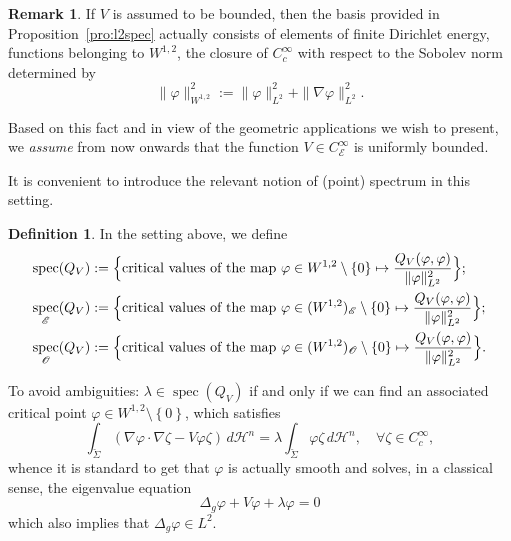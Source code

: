 \documentclass[10pt]{amsart}
\let\mathcal\mathscr
\DeclareMathOperator{\spec}{spec}
\theoremstyle{definition}
\newtheorem{definition}[thm]{Definition}
\newtheorem{rmk}[thm]{Remark}
\newcommand{\h}{\mathscr{H}}
\begin{document}
\begin{rmk}\label{rmk:Vbounded} If $V$ is assumed to be bounded, then the basis provided in Proposition~\ref{pro:l2spec} actually consists of elements of finite Dirichlet energy, \ie functions belonging to $W^{1,2}$, the closure of $C^{\infty}_c$ with respect to the Sobolev norm determined by
\begin{equation}\label{eq:SobNorm}
\|\varphi\|^2_{W^{1,2}}:= \|\varphi\|^2_{L^2}+\|\nabla \varphi\|^2_{L^2}.
\end{equation}
\end{rmk}

Based on this fact and in view of the geometric applications we wish to present, we \emph{assume} from now onwards that the function $V\in C^{\infty}_{\mathcal{E}}$ is uniformly bounded.

It is convenient to introduce the relevant notion of (point) spectrum in this setting.

\begin{definition}\label{def:spec} In the setting above, we define
\begin{align*}
\spec(Q_V)&:=\Bigl\{\text{critical values of the map} \ \varphi\in W^{1,2}\setminus \left\{0\right\} \mapsto \frac{Q_V(\varphi,\varphi)}{\|\varphi\|^2_{L^2}} \Bigr\};\\
\spec_{\mathcal{E}} (Q_V)&:= \Bigl\{\text{critical values of the map} \ \varphi\in (W^{1,2})_{\mathcal{E}}\setminus \left\{0\right\} \mapsto \frac{Q_V(\varphi,\varphi)}{\|\varphi\|^2_{L^2}} \Bigr\};\\
\spec_{\mathcal{O}} (Q_V)&:= \Bigl\{\text{critical values of the map} \ \varphi\in (W^{1,2})_{\mathcal{O}}\setminus \left\{0\right\} \mapsto \frac{Q_V(\varphi,\varphi)}{\|\varphi\|^2_{L^2}} \Bigr\}.
\end{align*}
\end{definition}
To avoid ambiguities: $\lambda\in \spec(Q_V)$ if and only if we can find an associated critical point $\varphi \in W^{1,2}\setminus\left\{0\right\}$, which satisfies
\begin{equation}\label{eq:weak}
\int_{\check{\Sigma}}(\nabla \varphi \cdot \nabla\zeta -V\varphi\zeta)\,d\h^n = \lambda \int_{\check{\Sigma}}\varphi\zeta\,d\h^n, \quad \forall \zeta\in C^{\infty}_c,
\end{equation}
whence it is standard to get that $\varphi$ is actually smooth and solves, in a classical sense, the eigenvalue equation
\[
\Delta_g \varphi+V\varphi+\lambda\varphi=0
\]
which also implies that $\Delta_g\varphi \in L^2$.
\end{document}
